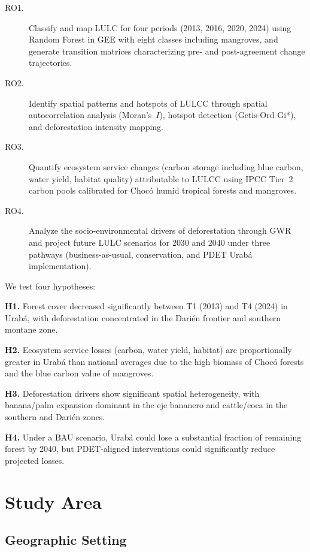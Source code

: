 \documentclass[12pt,a4paper]{article}
\begin{document}
\begin{description}
\item[RO1.] Classify and map LULC for four periods (2013, 2016, 2020, 2024) using Random Forest in GEE with eight classes including mangroves, and generate transition matrices characterizing pre- and post-agreement change trajectories.
\item[RO2.] Identify spatial patterns and hotspots of LULCC through spatial autocorrelation analysis (Moran's~$I$), hotspot detection (Getis-Ord Gi*), and deforestation intensity mapping.
\item[RO3.] Quantify ecosystem service changes (carbon storage including blue carbon, water yield, habitat quality) attributable to LULCC using IPCC Tier~2 carbon pools calibrated for Choc\'{o} humid tropical forests and mangroves.
\item[RO4.] Analyze the socio-environmental drivers of deforestation through GWR and project future LULC scenarios for 2030 and 2040 under three pathways (business-as-usual, conservation, and PDET Urab\'{a} implementation).
\end{description}

We test four hypotheses:

\textbf{H1.} Forest cover decreased significantly between T1 (2013) and T4 (2024) in Urab\'{a}, with deforestation concentrated in the Dari\'{e}n frontier and southern montane zone.

\textbf{H2.} Ecosystem service losses (carbon, water yield, habitat) are proportionally greater in Urab\'{a} than national averages due to the high biomass of Choc\'{o} forests and the blue carbon value of mangroves.

\textbf{H3.} Deforestation drivers show significant spatial heterogeneity, with banana/palm expansion dominant in the eje bananero and cattle/coca in the southern and Dari\'{e}n zones.

\textbf{H4.} Under a BAU scenario, Urab\'{a} could lose a substantial fraction of remaining forest by 2040, but PDET-aligned interventions could significantly reduce projected losses.


\section{Study Area}

\subsection{Geographic Setting}
\end{document}

